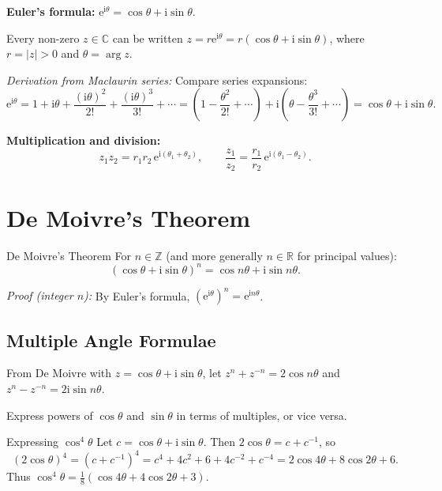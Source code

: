 \documentclass[12pt, a4paper]{book}
\newenvironment{keyresult}{%
  \begin{tcolorbox}[keystyle]%
}{%
  \end{tcolorbox}%
}
\newcommand{\R}{\mathbb{R}}
\newcommand{\C}{\mathbb{C}}
\newcommand{\Z}{\mathbb{Z}}
\newcommand{\e}{\mathrm{e}}
\newcommand{\ii}{\mathrm{i}}
\begin{document}
\begin{keyresult}
\textbf{Euler's formula:} $\e^{\ii\theta}=\cos\theta+\ii\sin\theta$.

Every non-zero $\displaystyle z\in\C$ can be written $\displaystyle z=r\e^{\ii\theta}=r(\cos\theta+\ii\sin\theta)$, where $\displaystyle r=|z|>0$ and $\displaystyle \theta=\arg z$.
\end{keyresult}

\textit{Derivation from Maclaurin series:} Compare series expansions:
\[
\e^{\ii\theta}=1+\ii\theta+\frac{(\ii\theta)^2}{2!}+\frac{(\ii\theta)^3}{3!}+\cdots=\left(1-\frac{\theta^2}{2!}+\cdots\right)+\ii\left(\theta-\frac{\theta^3}{3!}+\cdots\right)=\cos\theta+\ii\sin\theta.
\]

\textbf{Multiplication and division:}
\[
z_1z_2 = r_1r_2\,\e^{\ii(\theta_1+\theta_2)}, \qquad
\frac{z_1}{z_2}=\frac{r_1}{r_2}\,\e^{\ii(\theta_1-\theta_2)}.
\]

\section{De Moivre's Theorem}

\begin{theorem}{De Moivre's Theorem}{}
For $\displaystyle n\in\Z$ (and more generally $\displaystyle n\in\R$ for principal values):
\[
(\cos\theta+\ii\sin\theta)^n = \cos n\theta+\ii\sin n\theta.
\]
\end{theorem}

\textit{Proof (integer $\displaystyle n$):} By Euler's formula, $\displaystyle (\e^{\ii\theta})^n=\e^{\ii n\theta}$.

\subsection{Multiple Angle Formulae}

From De Moivre with $\displaystyle z=\cos\theta+\ii\sin\theta$, let $\displaystyle z^n+z^{-n}=2\cos n\theta$ and $\displaystyle z^n-z^{-n}=2\ii\sin n\theta$.

Express powers of $\cos\theta$ and $\sin\theta$ in terms of multiples, or vice versa.

\begin{example}{Expressing $\cos^4\theta$}{}
Let $\displaystyle c=\cos\theta+\ii\sin\theta$. Then $\displaystyle 2\cos\theta=c+c^{-1}$, so
\[
(2\cos\theta)^4=(c+c^{-1})^4=c^4+4c^2+6+4c^{-2}+c^{-4}=2\cos4\theta+8\cos2\theta+6.
\]
Thus $\displaystyle \cos^4\theta=\frac{1}{8}(\cos4\theta+4\cos2\theta+3)$.
\end{example}
\end{document}

